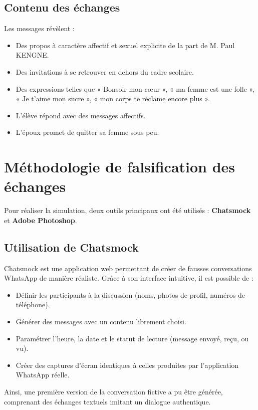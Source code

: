 \documentclass[12pt, a4paper]{article}
\begin{document}
\subsection{Contenu des échanges}
Les messages révèlent :
\begin{itemize}
	\item Des propos à caractère affectif et sexuel explicite de la part de M. Paul KENGNE.
	\item Des invitations à se retrouver en dehors du cadre scolaire.
	\item Des expressions telles que « Bonsoir mon cœur », « ma femme est une folle », « Je t’aime mon sucre », « mon corps te réclame encore plus ».
	\item L’élève répond avec des messages affectifs.
	\item L’époux promet de quitter sa femme sous peu.
\end{itemize}

\section{Méthodologie de falsification des échanges}
Pour réaliser la simulation, deux outils principaux ont été utilisés : \textbf{Chatsmock} et \textbf{Adobe Photoshop}.  

\subsection{Utilisation de Chatsmock}
Chatsmock est une application web permettant de créer de fausses conversations WhatsApp de manière réaliste.  
Grâce à son interface intuitive, il est possible de :  
\begin{itemize}
	\item Définir les participants à la discussion (noms, photos de profil, numéros de téléphone).  
	\item Générer des messages avec un contenu librement choisi.  
	\item Paramétrer l’heure, la date et le statut de lecture (message envoyé, reçu, ou vu).  
	\item Créer des captures d’écran identiques à celles produites par l’application WhatsApp réelle.  
\end{itemize}
Ainsi, une première version de la conversation fictive a pu être générée, comprenant des échanges textuels imitant un dialogue authentique.  
\end{document}
